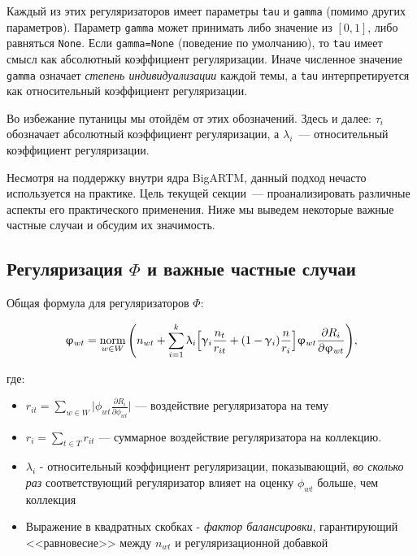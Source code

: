 Каждый из этих регуляризаторов имеет параметры \texttt{tau} и \texttt{gamma} (помимо других параметров). Параметр \texttt{gamma} может принимать либо значение из $[0, 1]$, либо равняться \texttt{None}. Если \texttt{gamma=None} (поведение по умолчанию), то \texttt{tau} имеет смысл как абсолютный коэффициент регуляризации. Иначе численное значение \texttt{gamma} означает \textit{степень индивидуализации} каждой темы, а \texttt{tau} интерпретируется как относительный коэффициент регуляризации.

Во избежание путаницы мы отойдём от этих обозначений. Здесь и далее: $\tau_i$ обозначает абсолютный коэффициент регуляризации, а $\lambda_i$~--- относительный коэффициент регуляризации.

Несмотря на поддержку внутри ядра BigARTM, данный подход нечасто используется на практике. Цель текущей секции~--- проанализировать различные аспекты его практического применения. Ниже мы выведем некоторые важные частные случаи и обсудим их значимость.

\subsection{Регуляризация $\Phi$ и важные частные случаи}

Общая формула для регуляризаторов $\Phi$:

\[
\upvarphi_{wt} = \mathop{\mathrm{norm}}\limits_{w \in W}\Bigg(
    n_{wt} + \sum_{i=1}^k \uplambda_i \Big[
        \upgamma_i \frac{n_t}{r_{it}} + (1-\upgamma_i)\frac{n}{r_i}
        \Big]
    \upvarphi_{wt} \frac{\partial R_i}{\partial \upvarphi_{wt}}
\Bigg), \label{rel_phi_general}
\]

где:

\begin{itemize}
    \item{$r_{it} = \sum_{w\in W} \Big| \phi_{wt} \frac{\partial R_i}{\partial \phi_{wt}} \Big| $ --- воздействие регуляризатора на тему}
    \item { $r_{i} = \sum_{t\in T} r_{it}$ --- суммарное воздействие регуляризатора на коллекцию.}
    \item { $\lambda_i$ - относительный коэффициент регуляризации, показывающий, \emph{во сколько раз} соответствующий регуляризатор влияет на оценку $\phi_{wt}$ больше, чем коллекция}
    \item {Выражение в квадратных скобках - \textit{фактор балансировки}, гарантирующий <<равновесие>> между $n_{wt}$ и регуляризационной добавкой}
\end{itemize}

